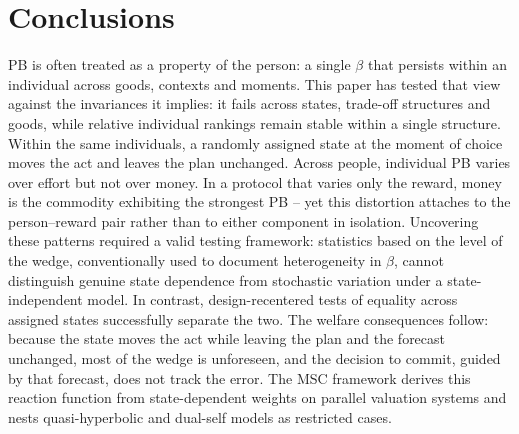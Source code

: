 \documentclass[11pt,a4paper]{article}
\theoremstyle{plain}
\theoremstyle{definition}
\begin{document}



\section{Conclusions}
\label{sec:limits}

PB is often treated as a property of the person: a single $\beta$ that persists within an individual across goods, contexts and moments. 
This paper has tested that view against the invariances it implies: it fails across states, trade-off structures and goods, while relative individual rankings remain stable within a single structure.
Within the same individuals, a randomly assigned state at the moment of choice moves the act and leaves the plan unchanged. Across people, individual PB varies over effort but not over money. 
In a protocol that varies only the reward, money is the commodity exhibiting the strongest PB -- yet this distortion attaches to the person--reward pair rather than to either component in isolation.
Uncovering these patterns required a valid testing framework: statistics based on the level of the wedge, conventionally used to document heterogeneity in $\beta$, cannot distinguish genuine state dependence from stochastic variation under a state-independent model. In contrast, design-recentered tests of equality across assigned states successfully separate the two.
The welfare consequences follow: because the state moves the act while leaving the plan and the forecast unchanged, most of the wedge is unforeseen, and the decision to commit, guided by that forecast, does not track the error. The MSC framework derives this reaction function from state-dependent weights on parallel valuation systems and nests quasi-hyperbolic and dual-self models as restricted cases.
\end{document}
